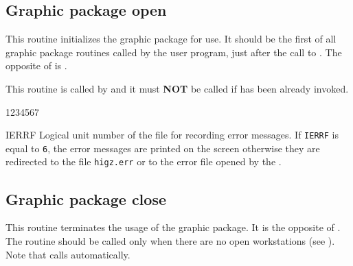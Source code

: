 \subsection{Graphic package open}
\Action
This routine initializes the graphic package for use. It should be the
first of all graphic package routines called by the user program, just after
the call to . The opposite of  is .
\par
This routine is called by  and it must {\bf NOT} be called if
 has been already invoked.
\Pdesc
\begin{DLtt}{1234567}
\item[IERRF] Logical unit number of the file for recording error messages.
             If {\tt IERRF} is equal to {\tt 6}, the error messages are printed
             on the screen otherwise they are redirected to the file
             {\tt higz.err} or to the error file opened by the \UGP.
\end{DLtt}
%
\subsection{Graphic package close}
\Action
This routine terminates the usage of the graphic package. It is the opposite
of . The routine  should be called only when there are
no open workstations (see ). Note that 
calls  automatically.
%
